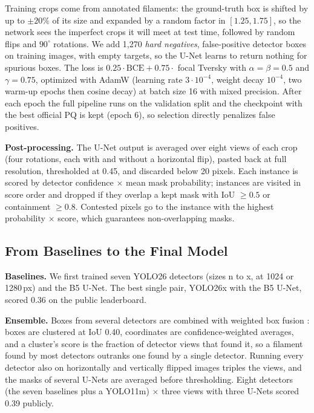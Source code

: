 \documentclass[sigconf]{acmart}
\begin{document}
    Training crops come from annotated filaments: the ground-truth box is shifted by up to $\pm20\%$ of its size and expanded by a random factor in $[1.25, 1.75]$, so the network sees the imperfect crops it will meet at test time, followed by random flips and $90^\circ$ rotations. We add 1,270 \emph{hard negatives}, false-positive detector boxes on training images, with empty targets, so the U-Net learns to return nothing for spurious boxes. The loss is $0.25\cdot\mathrm{BCE} + 0.75\cdot$ focal Tversky \cite{salehi2017tversky,abraham2019focal} with $\alpha=\beta=0.5$ and $\gamma=0.75$, optimized with AdamW \cite{loshchilov2019adamw} (learning rate $3\cdot10^{-4}$, weight decay $10^{-4}$, two warm-up epochs then cosine decay) at batch size 16 with mixed precision. After each epoch the full pipeline runs on the validation split and the checkpoint with the best official PQ is kept (epoch 6), so selection directly penalizes false positives.

    \textbf{Post-processing.} The U-Net output is averaged over eight views of each crop (four rotations, each with and without a horizontal flip), pasted back at full resolution, thresholded at 0.45, and discarded below 20 pixels. Each instance is scored by detector confidence $\times$ mean mask probability; instances are visited in score order and dropped if they overlap a kept mask with IoU $\geq 0.5$ or containment $\geq 0.8$. Contested pixels go to the instance with the highest probability $\times$ score, which guarantees non-overlapping masks.

\subsection{From Baselines to the Final Model}
    \textbf{Baselines.} We first trained seven YOLO26 detectors (sizes n to x, at 1024 or 1280\,px) and the B5 U-Net. The best single pair, YOLO26x with the B5 U-Net, scored 0.36 on the public leaderboard.

    \textbf{Ensemble.} Boxes from several detectors are combined with weighted box fusion \cite{solovyev2021wbf}: boxes are clustered at IoU 0.40, coordinates are confidence-weighted averages, and a cluster's score is the fraction of detector views that found it, so a filament found by most detectors outranks one found by a single detector. Running every detector also on horizontally and vertically flipped images triples the views, and the masks of several U-Nets are averaged before thresholding. Eight detectors (the seven baselines plus a YOLO11m) $\times$ three views with three U-Nets scored 0.39 publicly.
\end{document}
